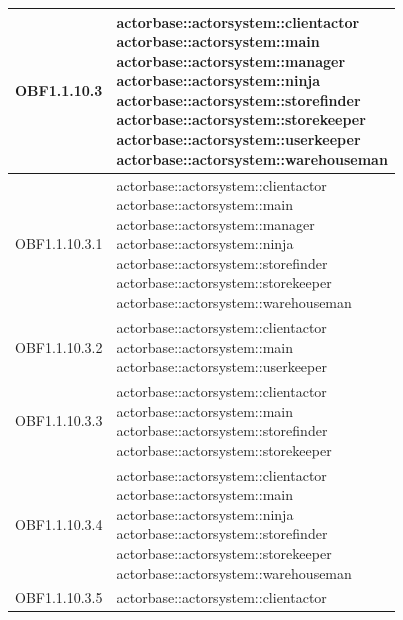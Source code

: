 \documentclass{scalatekids-article}
\begin{document}
\begin{longtable}[H]{|p{3.5cm}|p{7.5cm}|}
  \hline
  OBF1.1.10.3 & \multiLineCell[t]{actorbase::actorsystem::clientactor\\actorbase::actorsystem::main\\actorbase::actorsystem::manager\\actorbase::actorsystem::ninja\\actorbase::actorsystem::storefinder\\actorbase::actorsystem::storekeeper\\actorbase::actorsystem::userkeeper\\actorbase::actorsystem::warehouseman\\}\\
  \hline
  OBF1.1.10.3.1 & \multiLineCell[t]{actorbase::actorsystem::clientactor\\actorbase::actorsystem::main\\actorbase::actorsystem::manager\\actorbase::actorsystem::ninja\\actorbase::actorsystem::storefinder\\actorbase::actorsystem::storekeeper\\actorbase::actorsystem::warehouseman\\}\\
  \hline
  OBF1.1.10.3.2 & \multiLineCell[t]{actorbase::actorsystem::clientactor\\actorbase::actorsystem::main\\actorbase::actorsystem::userkeeper\\}\\
  \hline
  OBF1.1.10.3.3 & \multiLineCell[t]{actorbase::actorsystem::clientactor\\actorbase::actorsystem::main\\actorbase::actorsystem::storefinder\\actorbase::actorsystem::storekeeper\\}\\
  \hline
  OBF1.1.10.3.4 & \multiLineCell[t]{actorbase::actorsystem::clientactor\\actorbase::actorsystem::main\\actorbase::actorsystem::ninja\\actorbase::actorsystem::storefinder\\actorbase::actorsystem::storekeeper\\actorbase::actorsystem::warehouseman\\}\\
  \hline
  OBF1.1.10.3.5 & \multiLineCell[t]{actorbase::actorsystem::clientactor\\}\\

\end{longtable}
\end{document}
